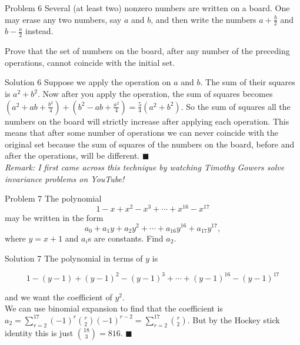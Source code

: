 \documentclass{article}
\begin{document}
\vspace{0.2cm}

\begin{problem}{Problem 6}
Several (at least two) nonzero numbers are written on a board. One may
erase any two numbers, say $a$ and $b$, and then write the numbers
$a + \frac{b}{2}$ and $b - \frac{a}{2}$ instead.

Prove that the set of numbers on the board, after any number of the
preceding operations, cannot coincide with the initial set.
\end{problem}

\begin{solution}{Solution 6}
Suppose we apply the operation on $a$ and $b$. The sum of their
squares is $a^2 + b^2$. Now after you apply the operation, the sum of
squares becomes $(a^2 + ab + \frac{b^2}{4}) + (b^2 - ab + \frac{a^2}{4}) =
\frac{5}{4} (a^2 + b^2)$. So the sum of squares all the numbers on the
board will strictly increase after applying each operation. This means that
after some number of operations we can never coincide with the original set
because the sum of squares of the numbers on the board, before and after
the operations, will be different.
$\blacksquare$
\\

\textit{Remark: I first came across this technique by watching Timothy
Gowers solve invariance problems on YouTube!}
\end{solution}

\vspace{0.2cm}

\begin{problem}{Problem 7}
The polynomial
\[
1 - x + x^{2} - x^{3} + \cdots + x^{16} - x^{17}
\]
may be written in the form
\[
a_0 + a_1 y + a_2 y^2 + \cdots + a_{16} y^{16} + a_{17} y^{17},
\]
where \( y = x + 1 \) and \( a_i \)s are constants. Find \( a_2 \).
\end{problem}

\begin{solution}{Solution 7}
The polynomial in terms of $y$ is

$$
1 - (y-1) + (y-1)^2 - (y-1)^3 + \cdots + (y-1)^{16} - (y-1)^{17}
$$

and we want the coefficient of $y^2$.\\

We can use binomial expansion to
find that the coefficient is
$ a_2 = \sum_{r=2}^{17} (-1)^r \binom{r}{2} (-1)^{r-2} =
\sum_{r=2}^{17} \binom{r}{2}$. But by the Hockey stick identity this is
just $\binom{18}{3} = 816$. $\blacksquare$

\end{solution}
\end{document}
